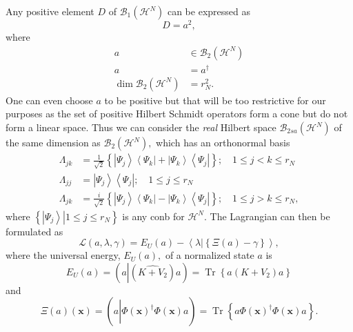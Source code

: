 \documentclass[aps,preprint]{revtex4}%
\begin{document}
Any positive element $D$ of $\mathcal{B}_{1}\left(  \mathcal{H}^{N}\right)  $
can be expressed as
\begin{equation}
D=a^{2},
\end{equation}
where
\begin{align}
a &  \in\mathcal{B}_{2}\left(  \mathcal{H}^{N}\right)  \nonumber\\
a &  =a^{\dagger}\nonumber\\
\dim\mathcal{B}_{2}\left(  \mathcal{H}^{N}\right)   &  =r_{N}^{2}.
\end{align}
One can even choose $a$ to be positive but that will be too restrictive for
our purposes as the set of positive Hilbert Schmidt operators form a cone but
do not form a linear space. Thus we can consider the \emph{real} Hilbert space
$\mathcal{B}_{2sa}\left(  \mathcal{H}^{N}\right)  $ of the same dimension as
$\mathcal{B}_{2}\left(  \mathcal{H}^{N}\right)  ,$ which has an orthonormal
basis
\begin{align}
\Lambda_{jk} &  =\frac{1}{\sqrt{2}}\left\{  \left\vert \Psi_{j}\right\rangle
\left\langle \Psi_{k}\right\vert +\left\vert \Psi_{k}\right\rangle
\left\langle \Psi_{j}\right\vert \right\}  ;\quad1\leq j<k\leq r_{N}%
\nonumber\\
\Lambda_{jj} &  =\left\vert \Psi_{j}\right\rangle \left\langle \Psi
_{j}\right\vert ;\quad1\leq j\leq r_{N}\nonumber\\
\Lambda_{jk} &  =\frac{i}{\sqrt{2}}\left\{  \left\vert \Psi_{j}\right\rangle
\left\langle \Psi_{k}\right\vert -\left\vert \Psi_{k}\right\rangle
\left\langle \Psi_{j}\right\vert \right\}  ;\quad1\leq j>k\leq r_{N},
\end{align}
where $\left\{  \left.  \left\vert \Psi_{j}\right\rangle \right\vert 1\leq
j\leq r_{N}\right\}  $ is any conb for $\mathcal{H}^{N}.$ The Lagrangian can
then be formulated as
\begin{equation}
\mathcal{L}\left(  a,\lambda,\gamma\right)  =E_{U}\left(  a\right)
-\left\langle \lambda\left\vert \left\{  \Xi\left(  a\right)  -\gamma\right\}
\right.  \right\rangle ,
\end{equation}
where the universal energy, $E_{U}\left(  a\right)  ,$ of a normalized state
$a$ is
\begin{equation}
E_{U}\left(  a\right)  =\left(  a\left\vert \left(  \widehat{K+V_{2}}\right)
\right.  a\right)  =\operatorname{Tr}\left\{  a\left(  K+V_{2}\right)
a\right\}
\end{equation}
and
\begin{equation}
\Xi\left(  a\right)  \left(  \mathbf{x}\right)  =\left(  a\left\vert
\widehat{\Phi\left(  \mathbf{x}\right)  ^{\dagger}\Phi\left(  \mathbf{x}%
\right)  }\right.  a\right)  =\operatorname{Tr}\left\{  a\Phi\left(
\mathbf{x}\right)  ^{\dagger}\Phi\left(  \mathbf{x}\right)  a\right\}  .
\end{equation}
\end{document}
